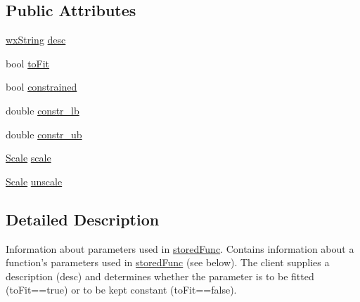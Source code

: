 \subsection*{Public Attributes}
\begin{DoxyCompactItemize}
\item 
\hyperlink{classwxString}{wxString} \hyperlink{structstf_1_1parInfo_a9fd83d6be04108ad0947ff0e336bb4c4}{desc}
\item 
bool \hyperlink{structstf_1_1parInfo_a204d67206f39c8e7a2efcfbd757f447b}{toFit}
\item 
bool \hyperlink{structstf_1_1parInfo_acd5ad5c8721d2d0275932671c81bac1a}{constrained}
\item 
double \hyperlink{structstf_1_1parInfo_a78f17a10d539858d71539135ee4e46ce}{constr\_\-lb}
\item 
double \hyperlink{structstf_1_1parInfo_a0cd313970fe68a4dc1ede892029f545a}{constr\_\-ub}
\item 
\hyperlink{group__stfgen_ga775530afebda38e8138e8eb1401a0e01}{Scale} \hyperlink{structstf_1_1parInfo_abfcd4e222d78f17e915b587457c98a37}{scale}
\item 
\hyperlink{group__stfgen_ga775530afebda38e8138e8eb1401a0e01}{Scale} \hyperlink{structstf_1_1parInfo_a5c3e4eecc13bbd9351ee862c1ddc9829}{unscale}
\end{DoxyCompactItemize}


\subsection{Detailed Description}
Information about parameters used in \hyperlink{structstf_1_1storedFunc}{storedFunc}. Contains information about a function's parameters used in \hyperlink{structstf_1_1storedFunc}{storedFunc} (see below). The client supplies a description (desc) and determines whether the parameter is to be fitted (toFit==true) or to be kept constant (toFit==false). 

